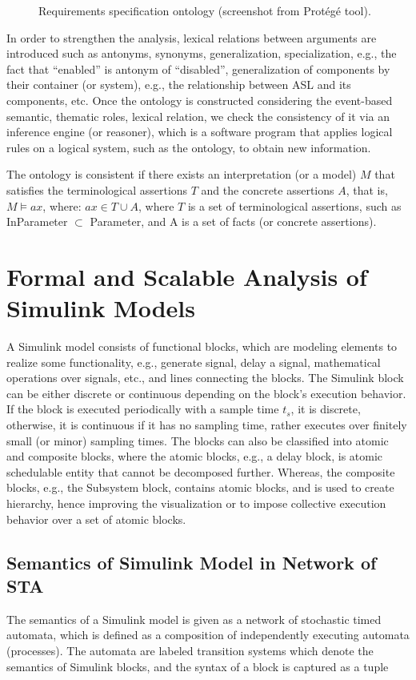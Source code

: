 \begin{figure}[h]
{} 
	\caption{Requirements specification ontology (screenshot from Prot\'eg\'e tool).} \label{fig_ontology}
\end{figure}

In order to strengthen the analysis, lexical relations between arguments are introduced such as antonyms, synonyms, generalization, specialization, e.g., the fact that ``enabled'' is antonym of ``disabled'', generalization of components by their container (or system), e.g., the relationship between ASL and its components, etc. Once the ontology is constructed considering the event-based semantic, thematic roles, lexical relation, we check the consistency of it via an inference engine (or reasoner), which is a software program that applies logical rules on a logical system, such as the ontology, to obtain new information.
\begin{definition}
 The ontology is consistent if there exists an interpretation (or a model) $M$ that satisfies the terminological assertions $T$ and the concrete assertions $A$, that is, $M \models ax$, where: $ax \in T \cup A$, where $T$ is a set of terminological assertions, such as InParameter $\subset$ Parameter, and A is a set of facts (or concrete assertions).
\end{definition}

\section{Formal and Scalable Analysis of Simulink Models}\label{rc_sim}
A Simulink model consists of functional blocks, which are modeling elements to realize some functionality, e.g., generate signal, delay a signal, mathematical operations over signals, etc., and lines connecting the blocks. The Simulink block can be either discrete or continuous depending on the block's execution behavior. If the block is executed periodically with a sample time $t_s$, it is discrete, otherwise, it is continuous if it has no sampling time, rather executes over finitely small (or minor) sampling times. The blocks can also be classified into atomic and composite blocks, where the atomic blocks, e.g., a delay block, is atomic schedulable entity that cannot be decomposed further. Whereas, the composite blocks, e.g., the Subsystem block, contains atomic blocks, and is used to create hierarchy, hence improving the visualization or to impose collective execution behavior over a set of atomic blocks. 

\subsection{Semantics of Simulink Model in Network of STA} 
The semantics of a Simulink model is given as a network of stochastic timed automata, which is defined as a composition of independently executing automata (processes). The automata are labeled transition systems which denote the semantics of Simulink blocks, and the syntax of a block is captured as a tuple 

